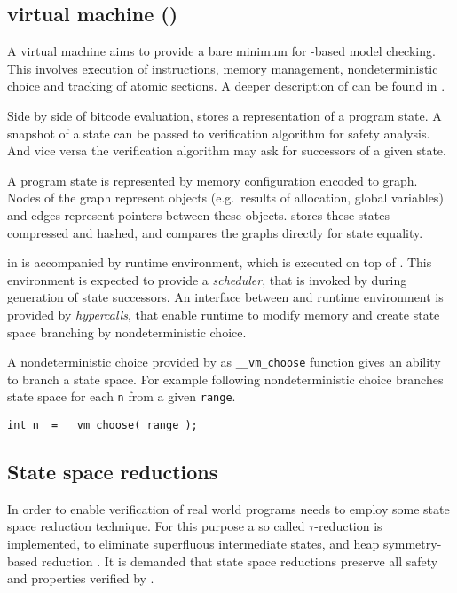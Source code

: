 \subsection{\DIVINE virtual machine (\DIVM)}

A \DIVINE virtual machine aims to provide a bare minimum for \LLVM-based
model checking. This involves execution of instructions, memory management,
nondeterministic choice and tracking of atomic sections. A deeper description of
\DIVM can be found in \cite{RockaiCB17}.

Side by side of \LLVM bitcode evaluation, \DIVM stores a representation of a
program state. A snapshot of a state can be passed to verification algorithm
for safety analysis. And vice versa the verification algorithm may ask \DIVM for
successors of a given state.

A program state is represented by memory configuration encoded to graph.
Nodes of the graph represent objects (e.g.~results of allocation, global
variables) and edges represent pointers between these objects.
\DIVM stores these states compressed and hashed, and compares the graphs
directly for state equality.

\DIVM in \DIVINE is accompanied by runtime environment, which is executed on top
of \DIVM. This environment is expected to provide a \emph{scheduler}, that is invoked
by \DIVM during generation of state successors. An interface between \DIVM and
runtime environment is provided by \emph{hypercalls}, that enable runtime to modify
memory and create state space branching by nondeterministic choice.

\begin{example}
A nondeterministic choice provided by \DIVM as \texttt{\_\_vm\_choose} function
gives an ability to branch a state space. For example following nondeterministic
choice branches state space for each \texttt{n} from a given \texttt{range}.

\begin{verbatim}
int n  = __vm_choose( range );
\end{verbatim}

\end{example}
\subsection{State space reductions}

In order to enable verification of real world programs \DIVINE needs to employ
some state space reduction technique. For this purpose a so called
$\tau$-reduction is implemented, to eliminate superfluous intermediate states,
and heap symmetry-based reduction \cite{Rockai13} \cite{RockaiCB17}. It is demanded
that state space reductions preserve all safety and \LTL properties verified
by \DIVINE.

